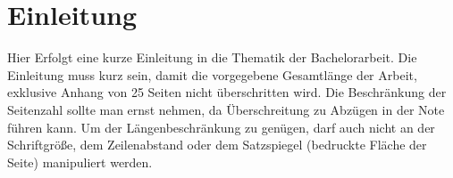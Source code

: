 \chapter{Einleitung}
Hier Erfolgt eine kurze Einleitung in die Thematik der Bachelorarbeit.
Die Einleitung muss kurz sein, damit die vorgegebene Gesamtlänge der 
Arbeit, exklusive Anhang von 25 Seiten nicht überschritten wird. 
Die Beschränkung der Seitenzahl sollte man ernst nehmen,
da Überschreitung zu Abzügen in der Note führen kann. 
Um der Längenbeschränkung zu genügen, darf auch nicht an der Schriftgröße,
dem Zeilenabstand oder dem Satzspiegel (bedruckte Fläche der Seite) manipuliert werden.
